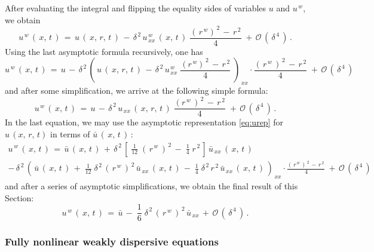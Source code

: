 \documentclass[alpha-refs, 12pt]{wiley-article}
\renewcommand{\O}{\mathcal{O}}
\begin{document}
After evaluating the integral and flipping the equality sides of variables $u$ and $u^{\,w}$, we obtain
\begin{equation*}
  u^{\,w}\,(\,x,\,t\,)\, = \,u\,(\,x,\,r,\,t\,)\,-\,\delta^{\,2}\,u^{\,w}_{\,xx}\,(\,x,\,t\,)\;\frac{(\,r^{\,w})^{\,2}\,-\,r^{\,2}}{4}\; + \,\O\,(\,\delta^{\,4}\,)\,.
\end{equation*}
Using the last asymptotic formula recursively, one has
\begin{equation*}
  u^{\,w}\,(\,x,\,t\,)\,=\,u\,-\,\delta^{\,2}\,\left(\,u\,(\,x,\,r,\,t\,)\,-\,\delta^{\,2}\,u^{\,w}_{\,xx}\;\frac{(r^{\,w})^{\,2}\,-\,r^{\,2}}{4}\;\right)_{\,xx}\cdot\frac{(\,r^{\,w}\,)^{\,2}\,-\,r^{\,2}}{4}\;+\,\O\,(\,\delta^{\,4}\,)
\end{equation*}
and after some simplification, we arrive at the following simple formula:
\begin{equation*}
  u^{\,w}\,(\,x,\,t\,)\,=\,u\,-\,\delta^{\,2}\,u_{\,xx}\,(\,x,\,r,\,t\,)\;\frac{(r^{\,w}\,)^{\,2}\,-\,r^{\,2}}{4}\;+\,\O\,(\,\delta^{\,4}\,)\,.
\end{equation*}
In the last equation, we may use the asymptotic representation \eqref{eq:urep} for $u\,(x,\,r,\,t)$ in terms of $\bar{u}\,(\,x,\,t\,)\,$:
\begin{multline*}
  u^{\,w}\,(\,x,\,t\,)\,=\,\bar{u}\,(\,x,\,t\,)\,+\,\delta^{\,2}\,\left[\;\frac{1}{12}\;(\,r^{\,w}\,)^{\,2}\,-\;\frac{1}{4}\;r^{\,2}\,\right]\,\bar{u}_{\,xx}\,(\,x,\,t\,)\\
  -\,\delta^{\,2}\,\left(\,\bar{u}\,(\,x,\,t\,)\, +\;\frac{1}{12}\;\delta^{\,2}\,(\,r^{\,w}\,)^{\,2}\,\bar{u}_{\,xx}\,(\,x,\,t\,)\,-\;\frac{1}{4}\;\delta^{\,2}\,r^{\,2}\,\bar{u}_{\,xx}\,(\,x,\,t\,)\,\right)_{\,xx}\cdot\frac{(\,r^{\,w}\,)^{\,2}\,-\,r^{\,2}}{\,4}\;+\,\O\,(\,\delta^{\,4}\,)
\end{multline*}
and after a series of asymptotic simplifications, we obtain the final result of this Section:
\begin{equation*}
  u^{\,w}\,(\,x,\,t\,)\,=\,\bar{u}\, -
  \;\frac{1}{6}\;\delta^{\,2}\,(\,r^{\,w}\,)^{\,2}\,\bar{u}_{\,xx}\, + \,\O\,(\,\delta^{\,4}\,)\,.
\end{equation*}

\subsubsection{Fully nonlinear weakly dispersive equations}
\end{document}
